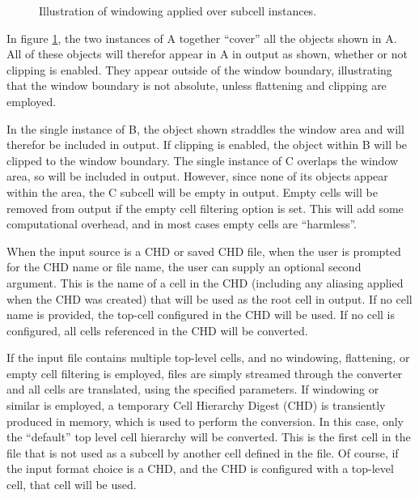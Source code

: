 \begin{figure}
\caption{\label{writeregion} Illustration of windowing applied over
subcell instances.}
\vspace{1.5ex}
\begin{center}
\end{center}
\end{figure}

In figure \ref{writeregion}, the two instances of A together ``cover''
all the objects shown in A.  All of these objects will therefor appear
in A in output as shown, whether or not clipping is enabled.  They
appear outside of the window boundary, illustrating that the window
boundary is not absolute, unless flattening and clipping are employed.

In the single instance of B, the object shown straddles the window
area and will therefor be included in output.  If clipping is enabled,
the object within B will be clipped to the window boundary.  The
single instance of C overlaps the window area, so will be included in
output.  However, since none of its objects appear within the area,
the C subcell will be empty in output.  Empty cells will be removed
from output if the empty cell filtering option is set.  This will add
some computational overhead, and in most cases empty cells are
``harmless''.

When the input source is a CHD or saved CHD file, when the user is
prompted for the CHD name or file name, the user can supply an
optional second argument.  This is the name of a cell in the CHD
(including any aliasing applied when the CHD was created) that will be
used as the root cell in output.  If no cell name is provided, the
top-cell configured in the CHD will be used.  If no cell is
configured, all cells referenced in the CHD will be converted.

If the input file contains multiple top-level cells, and no windowing,
flattening, or empty cell filtering is employed, files are simply
streamed through the converter and all cells are translated, using the
specified parameters.  If windowing or similar is employed, a
temporary Cell Hierarchy Digest (CHD) is transiently produced in
memory, which is used to perform the conversion.  In this case, only
the ``default'' top level cell hierarchy will be converted.  This is
the first cell in the file that is not used as a subcell by another
cell defined in the file.  Of course, if the input format choice is a
CHD, and the CHD is configured with a top-level cell, that cell will
be used.

